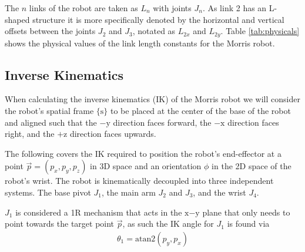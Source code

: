 \documentclass[a4paper,11pt]{article}
\begin{document}
The $n$ links of the robot are taken as $L_n$ with joints $J_n$. As link 2 has an L-shaped structure it is more specifically denoted by the horizontal and vertical offsets between the joints $J_{2}$ and $J_{3}$, notated as $L_{2x}$ and $L_{2y}$. Table \ref{tab:physicals} shows the physical values of the link length constants for the Morris robot.


\subsection{Inverse Kinematics}
When calculating the inverse kinematics (IK) of the Morris robot we will consider the robot's spatial frame $\{\mathrm{s}\}$ to be placed at the center of the base of the robot and aligned such that the $-\mathrm{y}$ direction faces forward, the $-\mathrm{x}$ direction faces right, and the $+\mathrm{z}$ direction faces upwards. 

The following covers the IK required to position the robot's end-effector at a point $\vec{p} = (p_{x},p_{y},p_{z})$ in 3D space and an orientation $\phi$ in the 2D space of the robot's wrist. The robot is kinematically decoupled into three independent systems. The base pivot $J_{1}$, the main arm $J_{2}$ and $J_{3}$, and the wrist $J_{4}$.

$J_{1}$ is considered a 1R mechanism that acts in the $\mathrm{x}\mathrm{-}\mathrm{y}$ plane that only needs to point towards the target point $\vec{p}$, as such the IK angle for $J_{1}$ is found via
\begin{align}
    \theta_{1} = \mathrm{atan2}(p_{y},p_{x})
    \label{eq:theta_1}
\end{align}
\end{document}
